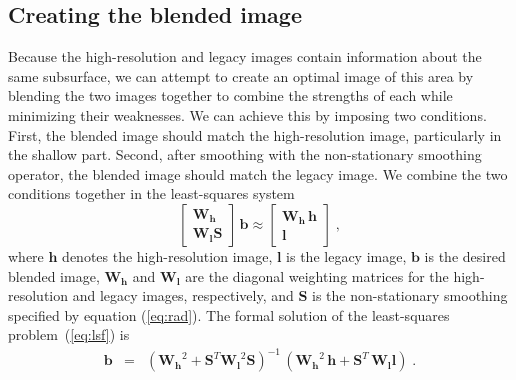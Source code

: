 \subsection{Creating the blended image}
    
    Because the high-resolution and legacy images contain information about the same subsurface, we can attempt to create an optimal image of this area by blending the two images together to combine the strengths of each while minimizing their weaknesses.
    We can achieve this by imposing two conditions. 
    First, the blended image should match the high-resolution image, particularly in the shallow part. 
    Second, after smoothing with the non-stationary smoothing operator, the blended image should match the legacy image. 
    We combine the two conditions together in the least-squares system
    \begin{equation}
        \label{eq:lsf}
        \left[\begin{array}{c} \mathbf{W_h} \\
                \mathbf{W_lS} \end{array}\right]\,\mathbf{b} \approx \left[\begin{array}{c} \mathbf{W_h\,h} \\
                \mathbf{l} \end{array}\right]\;,
    \end{equation}
    where $\mathbf{h}$ denotes the high-resolution image, $\mathbf{l}$ is the legacy image, $\mathbf{b}$ is the desired blended image, $\mathbf{W_h}$ and $\mathbf{W_l}$ are the diagonal weighting matrices for the high-resolution and legacy images, respectively, and $\mathbf{S}$ is the non-stationary smoothing specified by equation (\ref{eq:rad}). 
    The formal solution of the least-squares problem~(\ref{eq:lsf}) is
    \begin{eqnarray}
        \mathbf{b} & = & \left(\mathbf{W_h}^2 + \mathbf{S}^T\mathbf{W_l}^2\mathbf{S}\right)^{-1}\,\left(\mathbf{W_h}^2\,\mathbf{h}+\mathbf{S}^T\,\mathbf{W_l}\mathbf{l}\right)\;.
        \label{eq:inv}
    \end{eqnarray}
    
